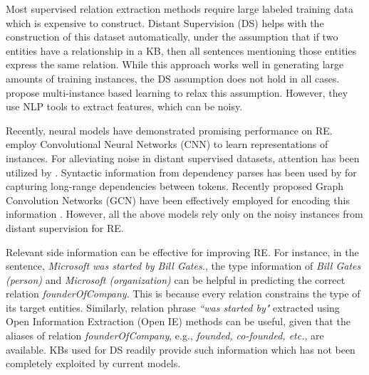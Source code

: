 \documentclass[11pt,a4paper]{article}
\begin{document}
Most supervised relation extraction methods require large labeled training data which is expensive to construct. Distant Supervision (DS) \cite{mintz2009distant} helps with the construction of this dataset automatically, under the assumption that if two entities have a relationship in a KB, then all sentences mentioning those entities express the same relation. While this approach works well in generating large amounts of training instances, the DS assumption does not hold in all cases. \citet{riedel2010modeling,hoffmann2011knowledge,surdeanu2012multi} propose multi-instance based learning to relax this assumption. However, they use NLP tools to extract features, which can be noisy. 



Recently, neural models have demonstrated promising performance on RE. \citet{zeng2014relation,zeng2015distant} employ Convolutional Neural Networks (CNN) to learn representations of instances. For alleviating noise in distant supervised datasets, attention has been utilized by \cite{lin2016neural,bgwa_paper}.
Syntactic information from dependency parses has been used by \cite{mintz2009distant,see_paper} for capturing long-range dependencies between tokens. Recently proposed Graph Convolution Networks (GCN) \cite{Defferrard:2016:CNN:3157382.3157527} have been effectively employed for encoding this information \cite{gcn_srl,gcn_nmt}. However, all the above models rely only on the noisy instances from distant supervision for RE.

Relevant side information can be effective for improving RE. For instance, in the sentence, \textit{Microsoft was started by Bill Gates.}, the type information of \textit{Bill Gates (person)}  and \textit{Microsoft (organization)} can be helpful in predicting the correct relation \textit{founderOfCompany}. This is because every relation constrains the type of its target entities. 
Similarly, relation phrase \textit{``was started by"} extracted using Open Information Extraction (Open IE) methods can be useful, given that the aliases of relation \textit{founderOfCompany}, e.g., \textit{founded, co-founded, etc.}, are available. KBs used for DS readily provide such information which has not been completely exploited by current models.
\end{document}
